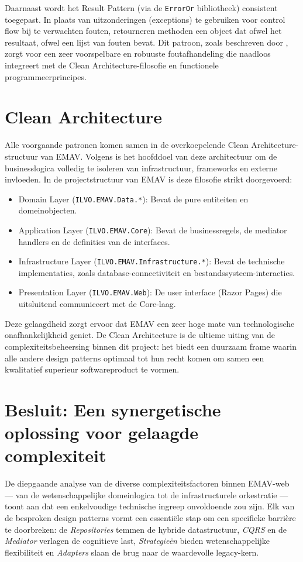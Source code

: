 Daarnaast wordt het Result Pattern (via de \texttt{ErrorOr} bibliotheek) consistent toegepast. 
In plaats van uitzonderingen (exceptions) te gebruiken voor control flow bij te verwachten fouten, retourneren methoden een object dat ofwel het resultaat, ofwel een lijst van fouten bevat. 
Dit patroon, zoals beschreven door \textcite{khorikovResultPattern}, zorgt voor een zeer voorspelbare en robuuste foutafhandeling die naadloos integreert met de Clean Architecture-filosofie en functionele programmeerprincipes.

\section{Clean Architecture}
Alle voorgaande patronen komen samen in de overkoepelende Clean Architecture-structuur van EMAV. 
Volgens \textcite{martin2017clean} is het hoofddoel van deze architectuur om de businesslogica volledig te isoleren van infrastructuur, frameworks en externe invloeden. 
In de projectstructuur van EMAV is deze filosofie strikt doorgevoerd:
\begin{itemize}
    \item Domain Layer (\nolinkurl{ILVO.EMAV.Data.*}): Bevat de pure entiteiten en domeinobjecten.
    \item Application Layer (\texttt{ILVO.EMAV.Core}): Bevat de businessregels, de mediator handlers en de definities van de interfaces.
    \item Infrastructure Layer (\nolinkurl{ILVO.EMAV.Infrastructure.*}): Bevat de technische implementaties, zoals database-connectiviteit en bestandssysteem-interacties.
    \item Presentation Layer (\texttt{ILVO.EMAV.Web}): De user interface (Razor Pages) die uitsluitend communiceert met de Core-laag.
\end{itemize}

Deze gelaagdheid zorgt ervoor dat EMAV een zeer hoge mate van technologische onafhankelijkheid geniet. De Clean Architecture is de ultieme uiting van de complexiteitsbeheersing binnen dit project: het biedt een duurzaam frame waarin alle andere design patterns optimaal tot hun recht komen om samen een kwalitatief superieur softwareproduct te vormen.

\section{Besluit: Een synergetische oplossing voor gelaagde complexiteit}
De diepgaande analyse van de diverse complexiteitsfactoren binnen EMAV-web — van de wetenschappelijke domeinlogica tot de infrastructurele orkestratie — toont aan dat een enkelvoudige technische ingreep onvoldoende zou zijn. Elk van de besproken design patterns vormt een essentiële stap om een specifieke barrière te doorbreken: de \textit{Repositories} temmen de hybride datastructuur, \textit{CQRS} en de \textit{Mediator} verlagen de cognitieve last, \textit{Strategieën} bieden wetenschappelijke flexibiliteit en \textit{Adapters} slaan de brug naar de waardevolle legacy-kern.

